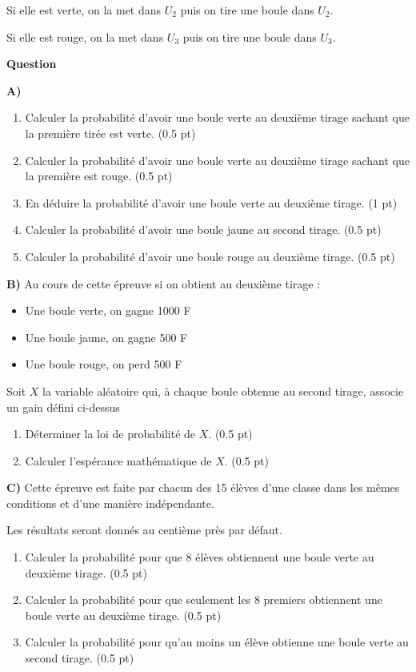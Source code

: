 \documentclass[12pt,a4paper]{article}
\begin{document}
Si elle est verte, on la met dans $U_2$ puis on tire une boule dans $U_2$.

Si elle est rouge, on la met dans $U_3$ puis on tire une boule dans $U_3$.

\textbf{Question}

\textbf{A)} 
\begin{enumerate}
    \item Calculer la probabilité d'avoir une boule verte au deuxième tirage sachant que la première tirée est verte. \hfill (0.5 pt)
    \item Calculer la probabilité d'avoir une boule verte au deuxième tirage sachant que la première est rouge. \hfill (0.5 pt)
    \item En déduire la probabilité d'avoir une boule verte au deuxième tirage. \hfill (1 pt)
    \item Calculer la probabilité d'avoir une boule jaune au second tirage. \hfill (0.5 pt)
    \item Calculer la probabilité d'avoir une boule rouge au deuxième tirage. \hfill (0.5 pt)
\end{enumerate}

\textbf{B)} Au cours de cette épreuve si on obtient au deuxième tirage :

\begin{itemize}
    \item Une boule verte, on gagne 1000 F
    \item Une boule jaune, on gagne 500 F
    \item Une boule rouge, on perd 500 F
\end{itemize}
    Soit $X$ la variable aléatoire qui, à chaque boule obtenue au second tirage, associe un gain défini ci-dessus
\begin{enumerate}
    \item Déterminer la loi de probabilité de $X$. \hfill (0.5 pt)
    \item Calculer l'espérance mathématique de $X$. \hfill (0.5 pt)
\end{enumerate}

\textbf{C)} Cette épreuve est faite par chacun des 15 élèves d'une classe dans les mêmes conditions et d'une manière indépendante.

Les résultats seront donnés au centième près par défaut.

\begin{enumerate}
    \item Calculer la probabilité pour que 8 élèves obtiennent une boule verte au deuxième tirage. \hfill (0.5 pt)
    \item Calculer la probabilité pour que seulement les 8 premiers obtiennent une boule verte au deuxième tirage. \hfill (0.5 pt)
    \item Calculer la probabilité pour qu'au moins un élève obtienne une boule verte au second tirage. \hfill (0.5 pt)
\end{enumerate}
\end{document}
